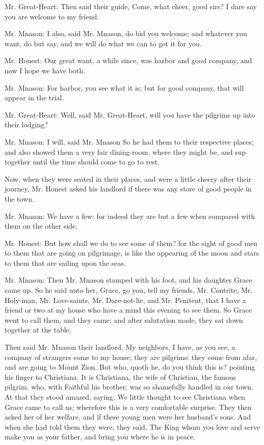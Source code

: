 Mr. Great-Heart: Then said their guide, Come, what cheer, good sirs? I dare say you are welcome to my friend.

Mr. Mnason: I also, said Mr. Mnason, do bid you welcome; and whatever you want, do but say, and we will do what we can to get it for you.

Mr. Honest: Our great want, a while since, was harbor and good company, and now I hope we have both.

Mr. Mnason: For harbor, you see what it is; but for good company, that will appear in the trial.

Mr. Great-Heart: Well, said Mr. Great-Heart, will you have the pilgrims up into their lodging?

Mr. Mnason: I will, said Mr. Mnason So he had them to their respective places; and also showed them a very fair dining-room, where they might be, and sup together until the time should come to go to rest.

Now, when they were seated in their places, and were a little cheery after their journey, Mr. Honest asked his landlord if there was any store of good people in the town.

Mr. Mnason: We have a few: for indeed they are but a few when compared with them on the other side.

Mr. Honest: But how shall we do to see some of them? for the sight of good men to them that are going on pilgrimage, is like the appearing of the moon and stars to them that are sailing upon the seas.

Mr. Mnason: Then Mr. Mnason stamped with his foot, and his daughter Grace came up. So he said unto her, Grace, go you, tell my friends, Mr. Contrite, Mr. Holy-man, Mr. Love-saints, Mr. Dare-not-lie, and Mr. Penitent, that I have a friend or two at my house who have a mind this evening to see them. So Grace went to call them, and they came; and after salutation made, they sat down together at the table.

Then said Mr. Mnason their landlord, My neighbors, I have, as you see, a company of strangers come to my house; they are pilgrims: they come from afar, and are going to Mount Zion. But who, quoth he, do you think this is? pointing his finger to Christiana. It is Christiana, the wife of Christian, the famous pilgrim, who, with Faithful his brother, was so shamefully handled in our town. At that they stood amazed, saying, We little thought to see Christiana when Grace came to call us; wherefore this is a very comfortable surprise. They then asked her of her welfare, and if these young men were her husband's sons. And when she had told them they were, they said, The King whom you love and serve make you as your father, and bring you where he is in peace.

